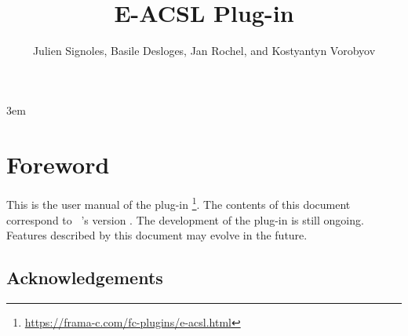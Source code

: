 \documentclass{frama-c-book}
\title{E-ACSL Plug-in}
\author{Julien Signoles, Basile Desloges, Jan Rochel, and Kostyantyn Vorobyov}
\begin{document}
\sloppy
\emergencystretch 3em

\maketitle
\tableofcontents


\chapter*{Foreword}
\markright{}

This is the user manual of the \framac plug-in
\eacsl\footnote{\url{https://frama-c.com/fc-plugins/e-acsl.html}}. The contents
of this document correspond to \framac~\cite{userman,baudin21cacm}'s version
\framacversion{}. The development of the \eacsl plug-in is still ongoing.
Features described by this document may evolve in the future.

\section*{Acknowledgements}

\insertpeople







\appendix




\cleardoublepage
{}






\cleardoublepage
{}
\printindex
\end{document}
